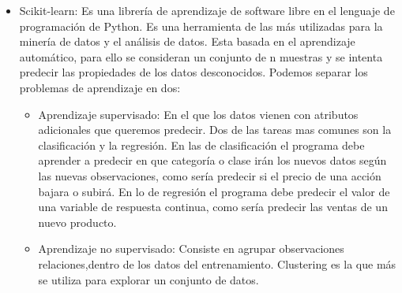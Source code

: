 
\begin{itemize}
\item Scikit-learn: Es una librería de aprendizaje de software libre en el lenguaje de programación de Python. Es una herramienta de las más utilizadas para la minería de datos y el análisis de datos. 
Esta basada en el aprendizaje automático, para ello se consideran un conjunto de n muestras y se intenta predecir las propiedades de los datos desconocidos. Podemos separar los problemas de aprendizaje en dos:

	\begin{itemize}
		\item Aprendizaje supervisado: En el que los datos vienen con atributos adicionales que queremos predecir. Dos de las tareas mas comunes son la clasificación y la regresión. En las de clasificación el programa debe aprender a predecir en que categoría o clase irán los nuevos datos según las nuevas observaciones, como sería predecir si el precio de una acción bajara o subirá. En lo de regresión el programa debe predecir el valor de una variable de respuesta continua, como sería predecir las ventas de un nuevo producto. 

		\item Aprendizaje no supervisado: Consiste en agrupar observaciones relaciones,dentro de los datos del entrenamiento. Clustering es la que más se utiliza para explorar un conjunto de datos.


\end{itemize}
\end{itemize}
